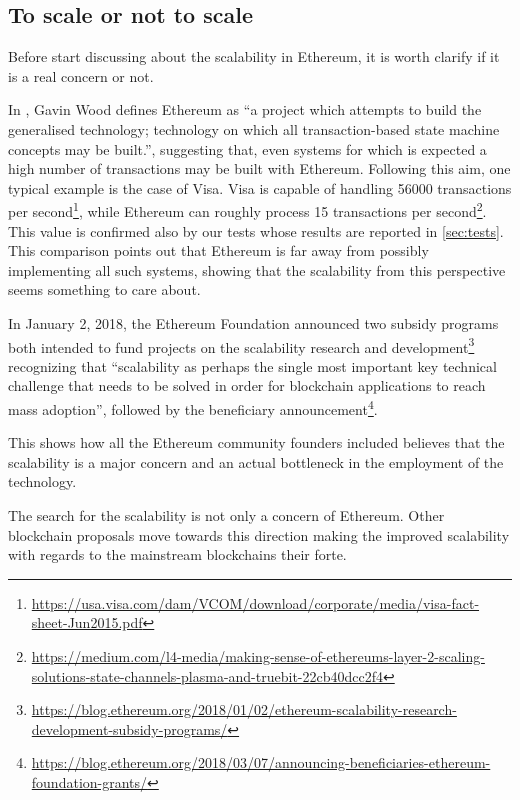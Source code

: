 \subsection{To scale or not to scale}

Before start discussing about the scalability in Ethereum, it is worth clarify
if it is a real concern or not.

In \cite{wood2018ethereum}, Gavin Wood defines Ethereum as ``a project which
attempts to build the generalised technology; technology on which all
transaction-based state machine concepts may be built.'', suggesting that, even
systems for which is expected a high number of transactions may be built with
Ethereum. Following this aim, one typical example is the case of Visa. Visa is
capable of handling 56000 transactions per
second\footnote{\url{https://usa.visa.com/dam/VCOM/download/corporate/media/visa-fact-sheet-Jun2015.pdf}},
while Ethereum can roughly process 15 transactions per
second\footnote{\url{https://medium.com/l4-media/making-sense-of-ethereums-layer-2-scaling-solutions-state-channels-plasma-and-truebit-22cb40dcc2f4}}.
This value is confirmed also by our tests whose results are reported in
\autoref{sec:tests}. This comparison points out that Ethereum is far away from
possibly implementing all such systems, showing that the scalability from this
perspective seems something to care about.

In January 2, 2018, the Ethereum Foundation announced two subsidy programs both
intended to fund projects on the scalability research and
development\footnote{\url{https://blog.ethereum.org/2018/01/02/ethereum-scalability-research-development-subsidy-programs/}}
recognizing that ``scalability as perhaps the single most important key
technical challenge that needs to be solved in order for blockchain applications
to reach mass adoption'', followed by the beneficiary
announcement\footnote{\url{https://blog.ethereum.org/2018/03/07/announcing-beneficiaries-ethereum-foundation-grants/}}.

This shows how all the Ethereum community founders included believes that the
scalability is a major concern and an actual bottleneck in the employment of the
technology.

The search for the scalability is not only a concern of Ethereum. Other
blockchain proposals move towards this direction making the improved scalability
with regards to the mainstream blockchains their forte.
